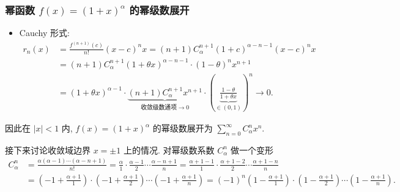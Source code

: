 \begin{frame}
\frametitle{幂函数 $f(x) = (1 + x)^{\alpha}$ 的幂级数展开}

\begin{itemize}
\item Cauchy 形式:
\begin{align*}
r_n(x) & = \frac{f^{(n+1)}(c)}{n!} (x - c)^n x = (n + 1) C_\alpha^{n+1} (1 + c)^{\alpha - n - 1} (x - c)^n x \\
& = (n + 1) C_\alpha^{n+1} (1 + \theta x)^{\alpha - n - 1} \cdot (1 - \theta)^n x^{n+1} \\
& = (1 + \theta x)^{\alpha-1} \cdot \underbrace{(n + 1) C_\alpha^{n+1} x^{n+1}}_{\text{收敛级数通项} \to 0} \cdot \left( \underbrace{\frac{1 - \theta}{1 + \theta x}}_{\in (0, 1)} \right)^n \to 0.
\end{align*}
\end{itemize}
因此在 $|x| < 1$ 内, $f(x) = (1 + x)^{\alpha}$ 的幂级数展开为 $\sum_{n=0}^\infty C_\alpha^n x^n.$

\pause
\vspace{0.5em}

{\color{red} } 接下来讨论收敛域边界 $x = \pm 1$ 上的情况.
\pause
对幂级数系数 $C_\alpha^n$ 做一个变形
{\smaller[1]
\begin{align*}
C_\alpha^n & = \frac{\alpha (\alpha - 1) \cdots (\alpha - n + 1)}{n!} = \frac{\alpha}{1} \cdot \frac{\alpha - 1}{2} \cdots \frac{\alpha - n + 1}{n} = \frac{\alpha+1-1}{1} \cdot \frac{\alpha+1-2}{2} \cdots \frac{\alpha+1-n}{n} \\
& = \left( -1 + \frac{\alpha+1}{1} \right) \cdot \left( -1 + \frac{\alpha+1}{2} \right) \cdots \left( -1 + \frac{\alpha+1}{n} \right) = (-1)^n \left( 1 - \frac{\alpha+1}{1} \right) \cdot \left( 1 - \frac{\alpha+1}{2} \right) \cdots \left( 1 - \frac{\alpha+1}{n} \right).
\end{align*}
}

\end{frame}


